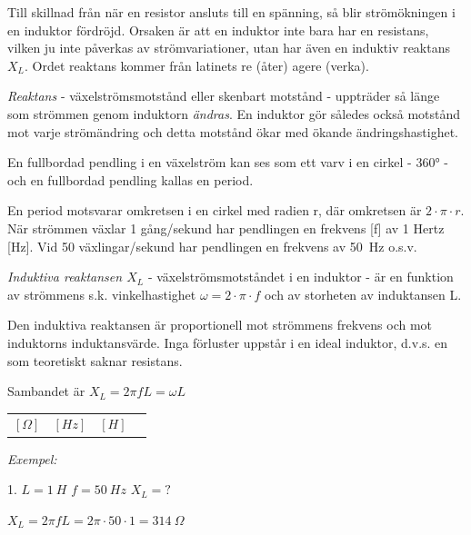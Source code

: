 Till skillnad från när en resistor ansluts till en spänning, så blir
strömökningen i en induktor fördröjd. Orsaken är att en induktor inte bara har
en resistans, vilken ju inte påverkas av strömvariationer, utan har även en
induktiv reaktans \(X_L\). Ordet reaktans kommer från latinets re (åter) agere
(verka).

\emph{Reaktans} - växelströmsmotstånd eller skenbart motstånd - uppträder så
länge som strömmen genom induktorn \emph{ändras}. En induktor gör således också
motstånd mot varje strömändring och detta motstånd ökar med ökande
ändringshastighet.

En fullbordad pendling i en växelström kan ses som ett varv i en cirkel - 360° -
och en fullbordad pendling kallas en period.

En period motsvarar omkretsen i en cirkel med radien r, där omkretsen är
\(2 \cdot π \cdot r\). När strömmen växlar 1 gång/sekund har
pendlingen en frekvens [f] av 1 Hertz [Hz]. Vid 50 växlingar/sekund har
pendlingen en frekvens av 50~Hz o.s.v.

\emph{Induktiva reaktansen \(X_L\)} - växelströmsmotståndet i en induktor - är
en funktion av strömmens s.k. vinkelhastighet \(\omega = 2 \cdot π \cdot f\) och
av storheten av induktansen L.

Den induktiva reaktansen är proportionell mot strömmens frekvens och mot
induktorns induktansvärde. Inga förluster uppstår i en ideal induktor, d.v.s. en
som teoretiskt saknar resistans.

Sambandet är
\(X_L = 2πfL = \omega L\)



\begin{tabular}{llll}
 \([\Omega]\) & \([Hz]\) & \([H]\)
 \end{tabular}

\emph{Exempel:}

1. \(L = 1\ H\) \(f = 50\ Hz\) \(X_L = ?\)

\(X_L = 2πfL = 2π \cdot 50 \cdot 1 = 314\ Ω\)

